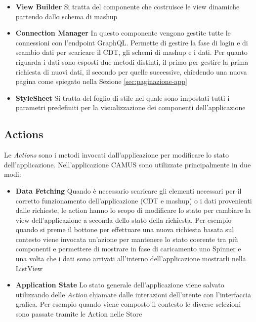 \begin{itemize}
	\item \textbf{View Builder}
	Si tratta del componente che costruisce le view dinamiche partendo dallo schema di mashup
	\item \textbf{Connection Manager}
	In questo componente vengono gestite tutte le connessioni con l'endpoint GraphQL. Permette di gestire la fase di login e di scambio dati per scaricare il CDT, gli schemi di mashup e i dati. Per quanto riguarda i dati sono esposti due metodi distinti, il primo per gestire la prima richiesta di nuovi dati, il secondo per quelle successive, chiedendo una nuova pagina come spiegato nella Sezione \ref{sec:paginazione-app}
	\item \textbf{StyleSheet}
	Si tratta del foglio di stile nel quale sono impostati tutti i parametri predefiniti per la visualizzazione dei componenti dell'applicazione
\end{itemize}

\subsection{Actions}\label{sec:actions}

Le \emph{Actions} sono i metodi invocati dall'ap\-pli\-ca\-zio\-ne per modificare lo stato dell'ap\-pli\-ca\-zio\-ne. Nell'applicazione CAMUS sono utilizzate principalmente in due modi:

\begin{itemize}
	\item \textbf{Data Fetching}
	Quando è necessario scaricare gli elementi necessari per il corretto funzionamento dell'applicazione (CDT e mashup) o i dati provenienti dalle richieste, le action hanno lo scopo di modificare lo stato per cambiare la view dell'applicazione a seconda dello stato della richiesta.
	Per esempio quando si preme il bottone per effettuare una nuova richiesta basata sul contesto viene invocata un'azione per mantenere lo stato coerente tra più componenti e permettere di mostrare in fase di caricamento uno Spinner e una volta che i dati sono arrivati all'interno dell'applicazione mostrarli nella ListView
	\item \textbf{Application State}
	Lo stato generale dell'applicazione viene salvato utilizzando delle \emph{Action} chiamate dalle interazioni dell'utente con l'interfaccia grafica. Per esempio quando viene composto il contesto le diverse selezioni sono passate tramite le Action nelle Store
\end{itemize}	


